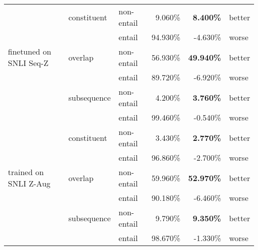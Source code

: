 \documentclass{article}
\begin{document}
\begin{table}[]
\begin{tabular}{lllrrl}
                                          & constituent         & non-entail          & 9.060\%                                & \textbf{8.400\%}                                & better        \\
                                          &                     & entail              & 94.930\%                               & -4.630\%                                        & worse         \\
        finetuned on SNLI Seq-Z          & overlap             & non-entail          & 56.930\%                               & \textbf{49.940\%}                               & better        \\
                                          &                     & entail              & 89.720\%                               & -6.920\%                                        & worse         \\
                                          & subsequence         & non-entail          & 4.200\%                                & \textbf{3.760\%}                                & better        \\
                                          &                     & entail              & 99.460\%                               & -0.540\%                                        & worse         \\
                                          & constituent         & non-entail          & 3.430\%                                & \textbf{2.770\%}                                & better        \\
                                          &                     & entail              & 96.860\%                               & -2.700\%                                        & worse         \\
        trained on SNLI Z-Aug            & overlap             & non-entail          & 59.960\%                               & \textbf{52.970\%}                               & better        \\
                                          &                     & entail              & 90.180\%                               & -6.460\%                                        & worse         \\
                                          & subsequence         & non-entail          & 9.790\%                                & \textbf{9.350\%}                                & better        \\
                                          &                     & entail              & 98.670\%                               & -1.330\%                                        & worse         \\

\end{tabular}
\end{table}
\end{document}
